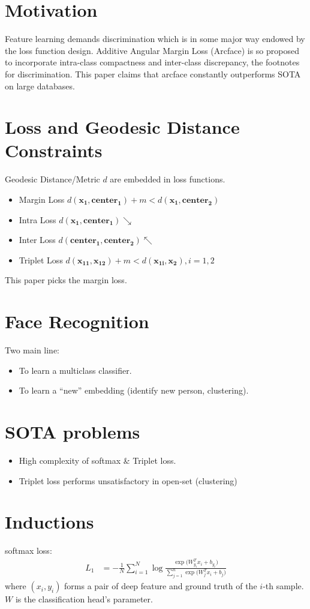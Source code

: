 \documentclass[a4paper]{article}
\newcommand{\vb}[1]{\mathbf{#1}}
\begin{document}
    \section{Motivation}
        Feature learning demands discrimination which is in some major way endowed by the 
        loss function design. Additive Angular Margin Loss (Arcface) is so proposed to 
        incorporate intra-class compactness and inter-class discrepancy, the footnotes for
        discrimination. This paper claims that arcface constantly outperforms SOTA on 
        large databases.
    \section{Loss and Geodesic Distance Constraints}
        Geodesic Distance/Metric $d$ are embedded in loss functions.
        \begin{itemize}
            \item Margin Loss\: $d(\vb{x_1, center_1}) + m < d(\vb{x_1, center_2})$
            \item Intra Loss\: $d(\vb{x_1, center_1}) \searrow$
            \item Inter Loss\: $d(\vb{center_1, center_2}) \nwarrow$
            \item Triplet Loss\: $d(\vb{x_{11}, x_{12}}) + m < d(\vb{x_{1i}, x_2}), i = 1,2$
        \end{itemize}
        This paper picks the margin loss.
    \section{Face Recognition}
        Two main line:
        \begin{itemize}
            \item To learn a multiclass classifier.
            \item To learn a ``new'' embedding (identify new person, clustering).
        \end{itemize}
    \section{SOTA problems}
        \begin{itemize}
            \item High complexity of softmax \& Triplet loss.
            \item Triplet loss performs unsatisfactory in open-set (clustering)
        \end{itemize}
    \section{Inductions}
        softmax loss:
        \begin{align*}
            L_1 &= -\frac{1}{N} \sum_{i=1}^N 
                \log \frac{\exp{\bigl(W_{y_i}^T x_i + b_{y_i}\bigr)}}
                    {\sum_{j=1}^n \exp{\bigl(W_j^T x_i + b_j\bigr)}}
        \end{align*}
        where $(x_i, y_i)$ forms a pair of deep feature and ground truth of the $i$-th 
        sample. $W$ is the classification head's parameter.
        
\end{document}
